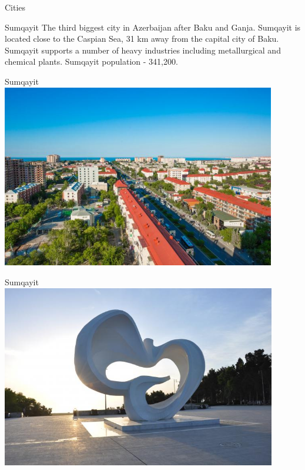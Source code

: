 \documentclass[hyperref={pdfpagemode=FullScreen}]{beamer}
\begin{document}
\begin{frame}{Cities}
\begin{alertblock}{Sumqayit}
\justifying The third biggest city in Azerbaijan after Baku and Ganja. Sumqayit is located close to the Caspian Sea, 31 km away from the capital city of Baku.
Sumqayit supports a number of heavy industries including metallurgical and chemical plants. Sumqayit population - 341,200.
\end{alertblock}
\end{frame}

\begin{frame}{Sumqayit}
\includegraphics[width=12cm, height=8cm]{img/sum01.jpg}
\end{frame}

\begin{frame}{Sumqayit}
\includegraphics[width=12cm, height=8cm]{img/sum02.jpg}
\end{frame}
\end{document}
